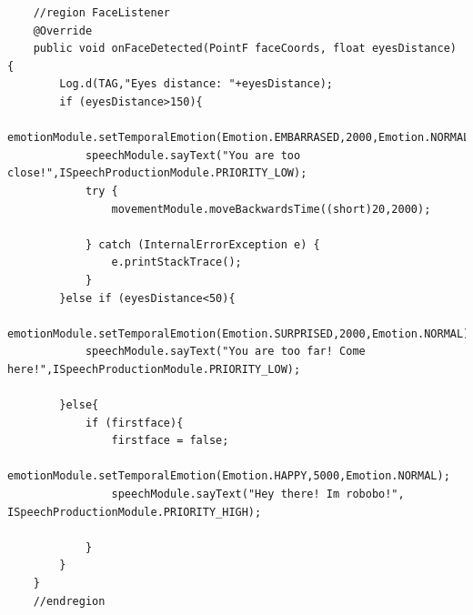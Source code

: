 \begin{lstlisting}
	//region FaceListener
    @Override
    public void onFaceDetected(PointF faceCoords, float eyesDistance) {
        Log.d(TAG,"Eyes distance: "+eyesDistance);
        if (eyesDistance>150){
            emotionModule.setTemporalEmotion(Emotion.EMBARRASED,2000,Emotion.NORMAL);
            speechModule.sayText("You are too close!",ISpeechProductionModule.PRIORITY_LOW);
            try {
                movementModule.moveBackwardsTime((short)20,2000);

            } catch (InternalErrorException e) {
                e.printStackTrace();
            }
        }else if (eyesDistance<50){
            emotionModule.setTemporalEmotion(Emotion.SURPRISED,2000,Emotion.NORMAL);
            speechModule.sayText("You are too far! Come here!",ISpeechProductionModule.PRIORITY_LOW);
            
        }else{
            if (firstface){
                firstface = false;
                emotionModule.setTemporalEmotion(Emotion.HAPPY,5000,Emotion.NORMAL);
                speechModule.sayText("Hey there! Im robobo!", ISpeechProductionModule.PRIORITY_HIGH);

            }
        }
    }
    //endregion
\end{lstlisting}


